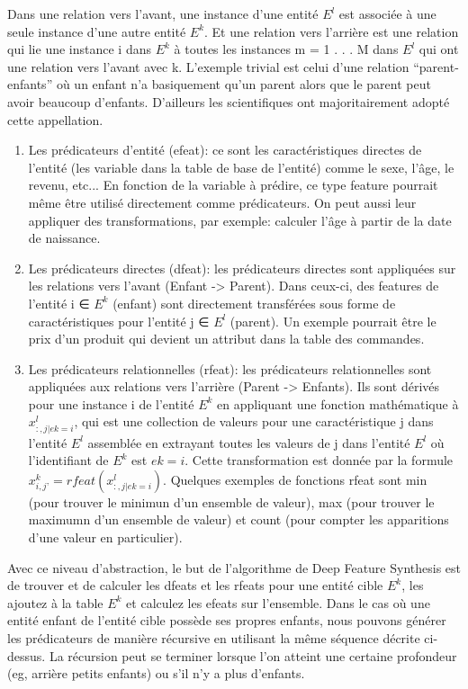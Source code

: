 Dans une relation vers l’avant, une instance d'une entité \(E^l\) est associée à une seule
instance d'une autre entité \(E^k\). Et une relation vers l'arrière est une relation qui lie une instance i dans \(E^k\) à toutes les instances m = {1 . . . M} dans \(E^l\) qui ont une relation vers l’avant avec k. L’exemple trivial est celui d’une relation “parent-enfants” où un enfant n’a basiquement qu’un parent alors que le parent peut avoir beaucoup d’enfants. D’ailleurs les scientifiques ont majoritairement adopté cette appellation.

\begin{enumerate}
    \item Les prédicateurs d'entité (efeat): ce sont les caractéristiques directes de l'entité (les variable dans la table de base de l'entité) comme le sexe, l’âge, le revenu, etc... En fonction de la variable à prédire, ce type feature pourrait même être utilisé directement comme prédicateurs. On peut aussi leur appliquer des transformations, par exemple: calculer l'âge à partir de la date de naissance.
    \item Les prédicateurs directes (dfeat): les prédicateurs directes sont appliquées sur les relations vers l’avant (Enfant -> Parent). Dans ceux-ci, des features de l’entité i ∈ \(E^k\) (enfant) sont directement transférées sous forme de caractéristiques pour l'entité j ∈  \(E^l\) (parent). Un exemple pourrait être le prix d'un produit qui devient un attribut dans la table des commandes.
    \item Les prédicateurs relationnelles (rfeat): les prédicateurs relationnelles sont appliquées aux relations vers l'arrière (Parent -> Enfants). Ils sont dérivés pour une instance i de l'entité \(E^k\) en appliquant une fonction mathématique à \(x_{:,j|ek=i}^l\), qui est une collection de valeurs pour une caractéristique j dans l’entité \(E^l\) assemblée en extrayant toutes les valeurs de j dans l'entité \(E^l\) où l'identifiant de \(E^k\) est \(ek = i\). Cette transformation est donnée par la formule \(x_{i,j’}^k = rfeat(x_{:,j|ek=i}^l)\). Quelques exemples de fonctions rfeat sont min (pour trouver le minimun d'un ensemble de valeur), max (pour trouver le maximumn d'un ensemble de valeur) et count (pour compter les apparitions d'une valeur en particulier).
\end{enumerate}

Avec ce niveau d'abstraction, le but de l'algorithme de Deep Feature Synthesis est de trouver et de calculer les dfeats et les rfeats pour une entité cible \(E^k\), les ajoutez à la table \(E^k\) et calculez les efeats sur l'ensemble. Dans le cas où une entité enfant de l’entité cible possède ses propres enfants, nous pouvons générer les prédicateurs de manière récursive en utilisant la même séquence décrite ci-dessus. La récursion peut se terminer lorsque l'on atteint une certaine profondeur (eg, arrière petits enfants) ou s'il n’y a plus d’enfants.

